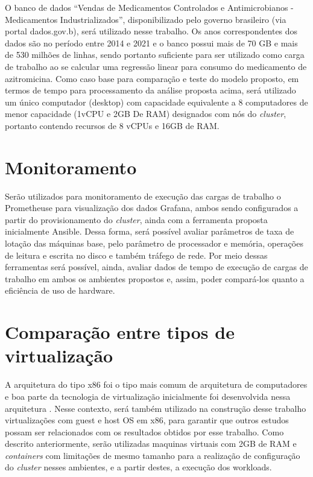 O banco de dados “Vendas de Medicamentos Controlados e Antimicrobianos - Medicamentos Industrializados”, disponibilizado pelo governo brasileiro (via portal dados.gov.b), será utilizado nesse trabalho. Os anos correspondentes dos dados são no período entre 2014 e 2021 e o banco possui mais de 70 GB  e mais de 530 milhões de linhas, sendo portanto suficiente para ser utilizado como carga de trabalho ao se calcular uma regressão linear para consumo do medicamento de azitromicina.
Como caso base para comparação e teste do modelo proposto, em termos de tempo para processamento da análise proposta acima, será utilizado um único computador (desktop) com capacidade equivalente a 8 computadores de menor capacidade (1vCPU e 2GB De RAM) designados com nós do  \emph{cluster}, portanto contendo recursos de  8 vCPUs e 16GB de RAM. 

\section{Monitoramento}
\label{cap:monitor}

Serão utilizados para monitoramento de execução das cargas de trabalho o Prometheus\textregistered  e para visualização dos dados Grafana\textregistered, ambos sendo configurados a partir do provisionamento do  \emph{cluster}, ainda com a ferramenta proposta inicialmente Ansible\textregistered. Dessa forma, será possível avaliar parâmetros de taxa de lotação das máquinas base, pelo parâmetro de processador e memória, operações de leitura e escrita no disco e também tráfego de rede. Por meio dessas ferramentas será possível, ainda, avaliar dados de tempo de execução de cargas de trabalho em ambos os ambientes propostos e, assim, poder compará-los quanto a eficiência de uso de hardware.

\section{Comparação entre tipos de virtualização}

A arquitetura do tipo x86 foi o tipo mais comum de arquitetura de computadores e boa parte da tecnologia de virtualização inicialmente foi desenvolvida nessa arquitetura \cite{fayyad_benchmarking_2013}. Nesse contexto, será também utilizado na construção desse trabalho virtualizações com guest e host OS em x86, para garantir que outros estudos possam ser relacionados com os resultados obtidos por esse trabalho.
Como descrito anteriormente, serão utilizadas maquinas virtuais com 2GB de RAM e  \emph{containers} com limitações de mesmo tamanho para a realização de configuração do  \emph{cluster} nesses ambientes, e a partir destes, a execução dos workloads.

